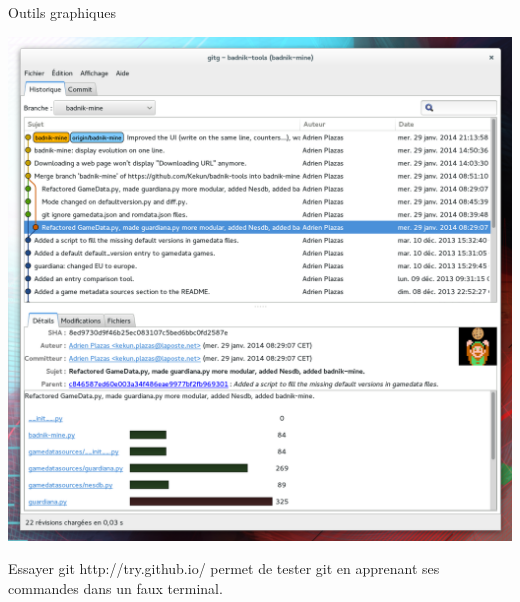 \begin{frame}{Outils graphiques}
\begin{center}
\includegraphics[scale=0.21]{gitg.png}
\end{center}
\end{frame}

\begin{frame}{Essayer git}
http://try.github.io/ permet de tester git en apprenant ses commandes dans un faux terminal.
\end{frame}


